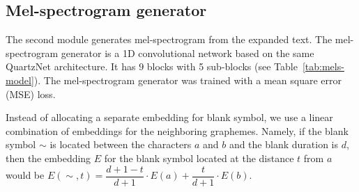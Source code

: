 \begin{table}[!ht]
\centering
{}
\caption{Duration's predictor results, LJSpeech test set. $P$ -- predicted, $T$ -- target.}
\label{tab:durs-results}
\end{table}

\subsection{Mel-spectrogram generator}

The second module generates mel-spectrogram from the expanded text. The mel-spectro\-gram generator is a 1D convolutional network based on the same QuartzNet architecture. It has $9$ blocks with 5 sub-blocks (see Table~\ref{tab:mels-model}). The mel-spectrogram generator was trained with a mean square error (MSE) loss.

Instead of allocating a separate embedding for blank symbol, we use a linear combination of embeddings for the neighboring graphemes. Namely, if the blank symbol $\sim$ is located between the  characters $a$ and $b$ and the blank duration is $d$, then the embedding $E$ for the blank symbol located at the distance $t$ from $a$ would be $E(\sim, t) = \dfrac{d+1-t}{d+1} \cdot E(a) + \dfrac{t}{d+1} \cdot E(b)$.

